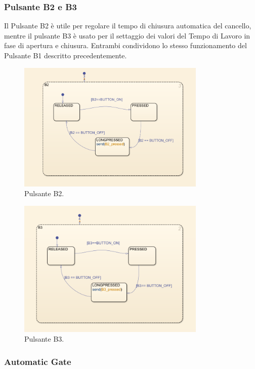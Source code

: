 \documentclass[12pt]{article}
\begin{document}
\subsubsection{Pulsante B2 e B3}

Il Pulsante B2 è utile per regolare il tempo di chiusura automatica del cancello, mentre il pulsante B3 è usato per il settaggio dei valori del Tempo di Lavoro in fase di apertura e chiusura. Entrambi condividono lo stesso funzionamento del Pulsante B1 descritto precedentemente.

\begin{figure}[H]
    \centering
    \includegraphics[width=0.8\textwidth]{imm/Pulsante_B2.png}
    \caption{Pulsante B2.}
\end{figure}

\begin{figure}[H]
    \centering
    \includegraphics[width=0.8\textwidth]{imm/Pulsante_B3.png}
    \caption{Pulsante B3.}
\end{figure}

\subsubsection{Automatic Gate}
\end{document}
